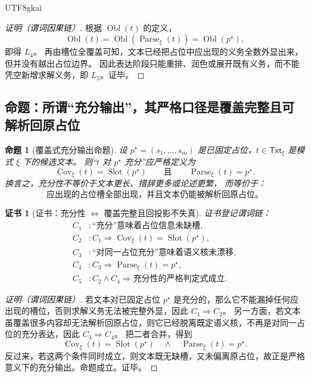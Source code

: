 \documentclass[12pt]{article}
\newtheorem{proposition}{命题}[section]
\newtheorem{Certificate}{证书}[section]
\newcommand{\Parse}{\operatorname{Parse}}
\begin{document}
\begin{CJK*}{UTF8}{gkai}
\begin{proof}[证明（谓词因果链）]
根据 $\operatorname{Obl}(t)$ 的定义，
\[
  \operatorname{Obl}(t)
  =
  \operatorname{Obl}(\Parse_\xi(t))
  =
  \operatorname{Obl}(p^\star),
\]
即得 $L_4$。
再由槽位全覆盖可知，文本已经把占位中应出现的义务全数外显出来，但并没有越出占位边界。
因此表达阶段只能重排、润色或展开既有义务，而不能凭空新增求解义务，即 $L_5$。证毕。
\end{proof}

\subsection{命题：所谓“充分输出”，其严格口径是覆盖完整且可解析回原占位}
\label{subsec:tex37-ch5-prop-coverage}

\begin{proposition}[覆盖式充分输出命题]
\label{prop:tex37-ch5-coverage}
设 $p^\star=(s_1,\dots,s_m)$ 是已固定占位，$t\in \mathsf{Txt}_\xi$ 是模式 $\xi$ 下的候选文本。
则“$t$ 对 $p^\star$ 充分”应严格定义为
\[
  \operatorname{Cov}_\xi(t)=\operatorname{Slot}(p^\star)
  \qquad\text{且}\qquad
  \Parse_\xi(t)=p^\star.
\]
换言之，充分性不等价于文本更长、措辞更多或论述更繁，
而等价于：
\[
  \boxed{
    \text{应出现的占位槽全部出现，并且文本仍能被解析回原占位。}
  }
\]
\end{proposition}

\begin{Certificate}[证书：充分性 $\Leftrightarrow$ 覆盖完整且回投影不失真]
\label{cert:tex37-ch5-coverage}
证书登记谓词链：
\[
\begin{aligned}
  C_1 &: \text{“充分”意味着占位信息未缺槽},\\
  C_2 &: C_1\Rightarrow \operatorname{Cov}_\xi(t)=\operatorname{Slot}(p^\star),\\
  C_3 &: \text{“对同一占位充分”意味着语义核未漂移},\\
  C_4 &: C_3\Rightarrow \Parse_\xi(t)=p^\star,\\
  C_5 &: C_2\wedge C_4\Rightarrow \text{充分性的严格判定式成立}.
\end{aligned}
\]
\end{Certificate}

\begin{proof}[证明（谓词因果链）]
若文本对已固定占位 $p^\star$ 是充分的，那么它不能漏掉任何应出现的槽位，否则求解义务无法被完整外显，因此 $C_1\Rightarrow C_2$。
另一方面，若文本虽覆盖很多内容却无法解析回原占位，则它已经脱离既定语义核，不再是对同一占位的充分表达，因此 $C_3\Rightarrow C_4$。
把二者合并，得到
\[
  \operatorname{Cov}_\xi(t)=\operatorname{Slot}(p^\star)
  \quad\wedge\quad
  \Parse_\xi(t)=p^\star.
\]
反过来，若这两个条件同时成立，则文本既无缺槽，又未偏离原占位，故正是严格意义下的充分输出。命题成立。证毕。
\end{proof}


\end{CJK*}
\end{document}
